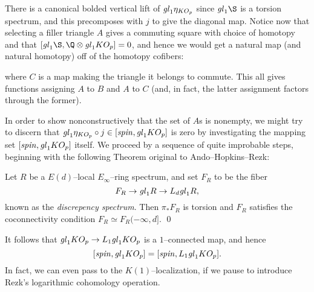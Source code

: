 There is a canonical bolded vertical lift of \(\mathit{gl}_1 \eta_{KO_p}\) since \(\gl_1 \S\) is a torsion spectrum, and this precomposes with \(j\) to give the diagonal map.  Notice now that selecting a filler triangle \(A\) gives a commuting square with choice of homotopy and that \([\gl_1 \S, \Q \otimes \gl_1 KO_p] = 0\), and hence we would get a natural map (and natural homotopy) off of the homotopy cofibers:
\begin{center}
\end{center}
where \(C\) is a map making the triangle it belongs to commute.  This all gives functions assigning \(A\) to \(B\) and \(A\) to \(C\) (and, in fact, the latter assignment factors through the former).

In order to show nonconstructively that the set of \(A\)s is nonempty, we might try to discern that \(\mathit{gl}_1 \eta_{KO_p} \circ j \in [\mathit{spin}, \mathit{gl}_1 KO_p]\) is zero by investigating the mapping set \([\mathit{spin}, \mathit{gl}_1 KO_p]\) itself.  We proceed by a sequence of quite improbable steps, beginning with the following Theorem original to Ando--Hopkins--Rezk:
\begin{theorem}\label{DiscrepancyDefinition}
Let \(R\) be a \(E(d)\)--local \(E_\infty\)--ring spectrum, and set \(F_R\) to be the fiber \[F_R \to \mathit{gl}_1 R \to L_d \mathit{gl}_1 R,\] known as the \textit{discrepency spectrum}.  Then \(\pi_* F_R\) is torsion and \(F_R\) satisfies the coconnectivity condition \(F_R \simeq F_R(-\infty, d]\). \qed
\end{theorem}

\noindent It follows that \(\mathit{gl}_1 KO_p \to L_1 \mathit{gl}_1 KO_p\) is a \(1\)--connected map, and hence \[[\mathit{spin}, \mathit{gl}_1 KO_p] = [\mathit{spin}, L_1 \mathit{gl}_1 KO_p].\]  In fact, we can even pass to the \(K(1)\)--localization, if we pause to introduce Rezk's logarithmic cohomology operation.

